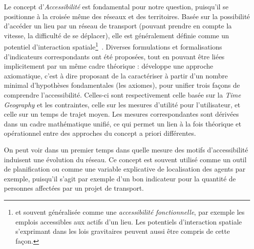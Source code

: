 {Le concept d'\emph{Accessibilité} est fondamental pour notre question, puisqu'il se positionne à la croisée même des réseaux et des territoires. Basée sur la possibilité d'accéder un lieu par un réseau de transport (pouvant prendre en compte la vitesse, la difficulté de se déplacer), elle est généralement définie comme un potentiel d'interaction spatiale\footnote{et souvent généralisée comme une \emph{accessibilité fonctionnelle}, par exemple les emplois accessibles aux actifs d'un lieu. Les potentiels d'interaction spatiale s'exprimant dans les lois gravitaires peuvent aussi être compris de cette façon.}~\cite{bavoux2005geographie}. Diverses formulations et formalisations d'indicateurs correspondants ont été proposées, tout en pouvant être liées implicitement par un même cadre théorique : \cite{miller1999measuring} développe une approche axiomatique, c'est à dire proposant de la caractériser à partir d'un nombre minimal d'hypothèses fondamentales (les axiomes), pour unifier trois façons de comprendre l'accessibilité. Celles-ci sont respectivement celle basée sur la \emph{Time Geography} et les contraintes, celle sur les mesures d'utilité pour l'utilisateur, et celle sur un temps de trajet moyen. Les mesures correspondantes sont dérivées dans un cadre mathématique unifié, ce qui permet un lien à la fois théorique et opérationnel entre des approches du concept a priori différentes.
}


\bpar{}
{
On peut voir dans un premier temps dans quelle mesure des motifs d'accessibilité induisent une évolution du réseau. Ce concept est souvent utilisé comme un outil de planification ou comme une variable explicative de localisation des agents par exemple, puisqu'il s'agit par exemple d'un bon indicateur pour la quantité de personnes affectées par un projet de transport.}


